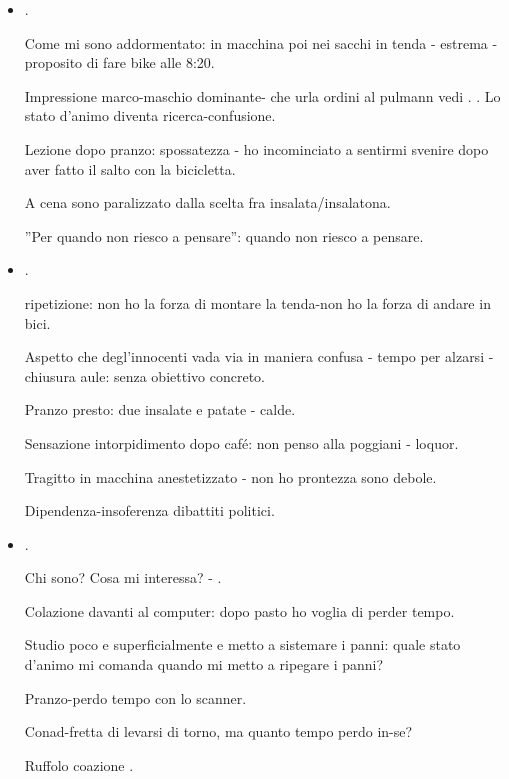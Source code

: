 \begin{itemize}
\item {}.

Come mi sono addormentato: in macchina poi nei sacchi in tenda - estrema - proposito di fare bike  alle 8:20.

Impressione marco-maschio dominante- che urla ordini al pulmann vedi . . Lo stato d'animo diventa ricerca-confusione.

Lezione dopo pranzo: spossatezza - ho incominciato a sentirmi svenire dopo aver fatto il salto con la bicicletta.

A cena sono paralizzato dalla scelta fra insalata/insalatona.

''Per quando non riesco a pensare'':  quando non riesco a pensare.

\item {}.

ripetizione: non ho la forza di montare la tenda-non ho la forza di andare in bici.

Aspetto che degl'innocenti vada via in maniera confusa - tempo per alzarsi - chiusura aule:  senza obiettivo concreto.

Pranzo presto: due insalate e patate - calde.

Sensazione intorpidimento dopo caf\'e: non penso alla poggiani - loquor.

Tragitto in macchina anestetizzato - non ho prontezza sono debole.

Dipendenza-insoferenza dibattiti politici.

\item {}.

Chi sono? Cosa mi interessa? - .

Colazione davanti al computer: dopo pasto ho voglia di perder tempo.

Studio poco e superficialmente e metto a sistemare i panni: quale stato d'animo mi comanda quando mi metto a ripegare i panni?

Pranzo-perdo tempo con lo scanner.

Conad-fretta di levarsi di torno, ma quanto tempo perdo in-se?

Ruffolo coazione .


\end{itemize}
